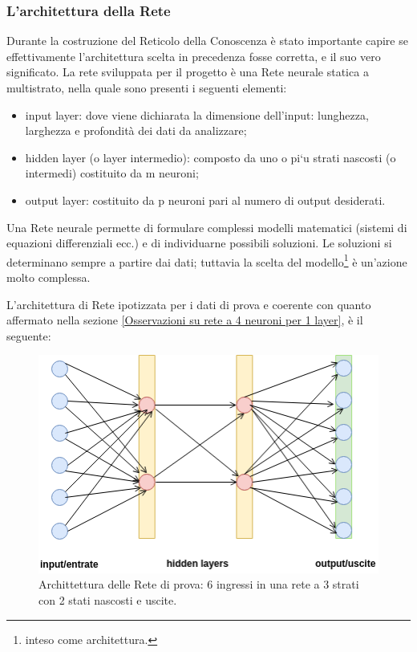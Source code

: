 \subsubsection{L'architettura della Rete}
\label{L'architettura della Rete}
Durante la costruzione del Reticolo della Conoscenza \`e stato importante capire se effettivamente l'architettura scelta in precedenza fosse corretta, e il suo vero significato. La rete sviluppata per il progetto \`e una Rete neurale statica a multistrato, nella quale sono presenti i seguenti elementi:
\begin{itemize}
\item input layer: dove viene dichiarata la dimensione dell'input: lunghezza, larghezza e profondit\`a dei dati da analizzare;
\item hidden layer (o layer intermedio): composto da uno o pi`u strati nascosti (o intermedi) costituito da m neuroni;
\item output layer:  costituito da p neuroni pari al numero di output desiderati.
\end{itemize}
\noindent 
Una Rete neurale permette di formulare complessi modelli matematici (sistemi di equazioni differenziali ecc.) e di individuarne possibili soluzioni. Le soluzioni si determinano sempre a partire dai dati; tuttavia la scelta del modello\footnote{inteso come architettura.} \`e un'azione molto complessa.

L'architettura di Rete ipotizzata per i dati di prova e coerente con quanto affermato nella sezione \ref{Osservazioni su rete a 4 neuroni per 1 layer}, è il seguente:
\noindent
\begin{figure}[H]
\centering
	\includegraphics[width=0.60\linewidth]{./image/architettura-rete-prova.png}
	\caption{Archittettura delle Rete di prova: 6 ingressi in una rete a 3 strati con 2 stati nascosti e uscite.}
	\label{Archittettura delle Rete di prova: 6 ingressi in una rete a 3 strati con 2 stati nascosti e uscite.}
\end{figure}
\noindent



